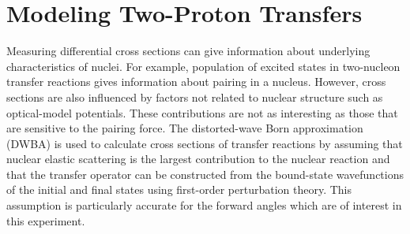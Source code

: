 \section{Modeling Two-Proton Transfers}

Measuring differential cross sections can give information about underlying characteristics of nuclei.  For example, population of excited \zp states in two-nucleon transfer reactions gives information about pairing in a nucleus.  However, cross sections are also influenced by factors not related to nuclear structure such as optical-model potentials.  These contributions are not as interesting as those that are sensitive to the pairing force.  The distorted-wave Born approximation (DWBA) is used to calculate cross sections of transfer reactions by assuming that nuclear elastic scattering is the largest contribution to the nuclear reaction and that the transfer operator can be constructed from the bound-state wavefunctions of the initial and final states using first-order perturbation theory.  This assumption is particularly accurate for the forward angles which are of interest in this experiment.

